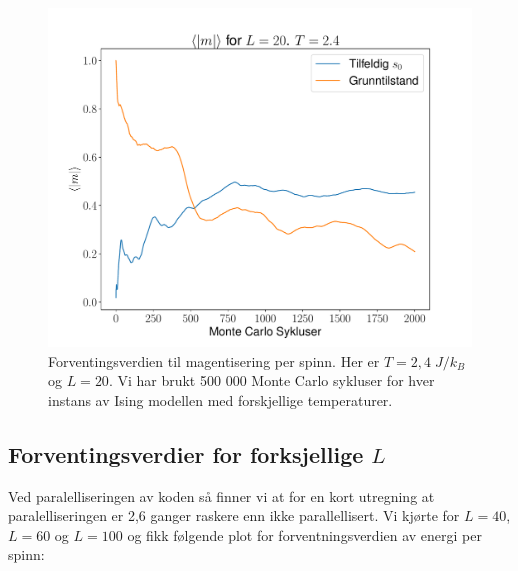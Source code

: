 \documentclass[reprint,english,notitlepage]{revtex4-1}  %
\begin{document}
\begin{figure}[H]
\centering
\includegraphics[scale=0.4, trim=2.5cm 0 0 0 ]{../Images/meanmT24L20.pdf}
\caption{Forventingsverdien til magentisering per spinn. Her er $T=2,4 \; J/k_B$ og $L = 20$. Vi har brukt 500 000 Monte Carlo sykluser for hver instans av Ising modellen med forskjellige temperaturer. }
\label{Fig:5m24}
\end{figure}

\subsection*{Forventingsverdier for forksjellige $L$}

Ved paralelliseringen av koden så finner vi at for en kort utregning at paralelliseringen er 2,6 ganger raskere enn ikke parallellisert. Vi kjørte for $L = 40$, $L = 60$ og $L = 100$ og fikk følgende plot for forventningsverdien av energi per spinn:
\end{document}
